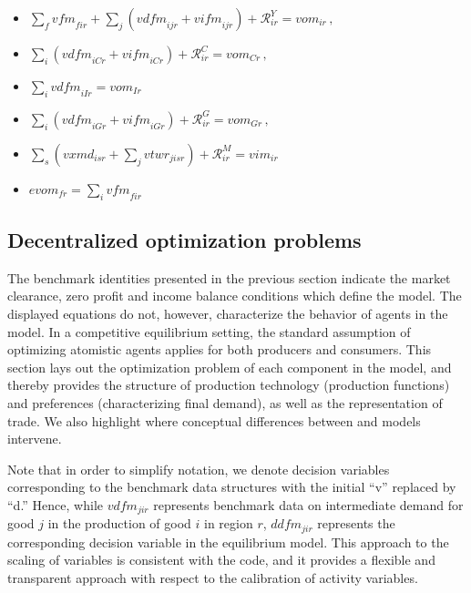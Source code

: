 \begin{itemize}
\item[$Y_{ir}$:] $\sum_f \textit{vfm}_{fir} + \sum_j
\left(\textit{vdfm}_{ijr} + \textit{vifm}_{ijr} \right) +
\mathcal{R}^Y_{ir} = \textit{vom}_{ir}\,,$
\item[$Y_{Cr}$:] $\sum_i \left(\textit{vdfm}_{iCr} +
\textit{vifm}_{iCr} \right) + \mathcal{R}^C_{ir} = \textit{vom}_{Cr}\,,$
\item[$Y_{Ir}$:] $\sum_i \textit{vdfm}_{iIr} = \textit{vom}_{Ir}$
\item[$Y_{Gr}$:] $\sum_i \left(\textit{vdfm}_{iGr} +
\textit{vifm}_{iGr} \right) + \mathcal{R}^G_{ir} =
\textit{vom}_{Gr}\,,$
\item[$M_{ir}$:] $\sum_s \left(\textit{vxmd}_{isr} + \sum_j
\textit{vtwr}_{jisr} \right) + \mathcal{R}^M_{ir} = \textit{vim}_{ir}$
\item[$FT_{fr}$:] $\textit{evom}_{fr} = \sum_i \textit{vfm}_{fir}$
\end{itemize}

\subsection[Optimization problems]{Decentralized optimization problems}

The benchmark identities presented in the previous section indicate
the market clearance, zero profit and income balance conditions which
define the \GTAP model. The displayed equations do not, however,
characterize the behavior of agents in the model. In a competitive
equilibrium setting, the standard assumption of optimizing atomistic
agents applies for both producers and consumers. This section lays out
the optimization problem of each component in the model, and thereby
provides the structure of production technology (production functions)
and preferences (characterizing final demand), as well as the
representation of trade. We also highlight where conceptual
differences between \GMR and \SOE models intervene.

Note that in order to simplify notation, we denote decision variables
corresponding to the benchmark data structures with the initial ``v''
replaced by ``d.'' Hence, while $vdfm_{jir}$ represents benchmark data
on intermediate demand for good $j$ in the production of good $i$ in
region $r$, $ddfm_{jir}$ represents the corresponding decision
variable in the equilibrium model. This approach to the scaling of
variables is consistent with the \GAMS code, and it provides a
flexible and transparent approach with respect to the calibration of
activity variables.

